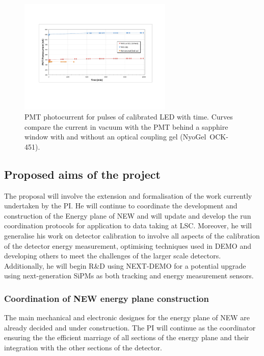 \documentclass[a4paper,11pt,oneside]{article}
\begin{document}
\begin{figure}
  \begin{center}
    \includegraphics[width=0.65\textwidth]{img/gelPlot}
  \end{center}
  \caption{PMT photocurrent for pulses of calibrated LED with
    time. Curves compare the current in vacuum with the PMT behind a
    sapphire window with and without an optical coupling gel (NyoGel~OCK-451).}
  \label{fig:gelPer}
\end{figure}

\subsection*{Proposed aims of the project}
\label{subSec:Prop}
The proposal will involve the extension and formalisation of the work
currently undertaken by the PI. He will continue to coordinate the
development and construction of the Energy plane of NEW and will
update and develop the run coordination protocols for application to
data taking at LSC. Moreover, he will
generalise his work on detector calibration to involve all aspects of
the calibration of the detector energy measurement, optimising
techniques used in DEMO and developing others to meet the challenges
of the larger scale detectors. Additionally, he will begin R\&D using
NEXT-DEMO for a potential upgrade using next-generation SiPMs as both tracking and
energy measurement sensors.

\subsubsection*{Coordination of NEW energy plane construction}
The main mechanical and electronic designes for the energy plane of
NEW are already decided and under construction. The PI will continue
as the coordinator ensuring the the efficient marriage of all sections
of the energy plane and their integration with the other sections of
the detector.
\end{document}
